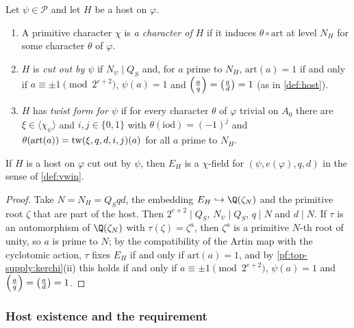 \begin{definition}\label{pf:top-supply:kerchi}
Let $\psi\in\mathcal P$ and let $H$ be a host on $\varphi$.
\begin{enumerate}[label=(\roman*)]
\item A primitive character $\chi$ is \emph{a character of $H$} if it induces $\theta\circ\mathrm{art}$ at level
$N_H$ for some character $\theta$ of $\varphi$.
\item $H$ is \emph{cut out by $\psi$} if $N_\psi\mid Q_S$ and, for $a$ prime to $N_H$, $\mathrm{art}(a)=1$ if and only
if $a\equiv\pm1\pmod{2^{e+2}}$, $\psi(a)=1$ and $\left(\frac{a}{q}\right)=\left(\frac{a}{d}\right)=1$ (as in \cref{def:host}).
\item $H$ has \emph{twist form for $\psi$} if for every character $\theta$ of $\varphi$ trivial on $A_0$ there
are $\xi\in\langle\chi_\psi\rangle$ and $i,j\in\{0,1\}$ with $\theta(\mathrm{iod})=(-1)^j$ and
$\theta(\mathrm{art}(a))=\operatorname{tw}(\xi,q,d,i,j)(a)$ for all $a$ prime to $N_H$.
\end{enumerate}
  
\end{definition}

\begin{lemma}\label{pf:top-supply:ischifield}
If $H$ is a host on $\varphi$ cut out by $\psi$, then $E_H$ is a $\chi$-field for $(\psi,e(\varphi),q,d)$ in the sense
of \cref{def:vwin}. 
\end{lemma}

\begin{proof}
Take $N=N_H=Q_Sqd$, the embedding $E_H\hookrightarrow\Q(\zeta_N)$ and the primitive root $\zeta$ that are part of
the host. Then $2^{e+2}\mid Q_S$, $N_\psi\mid Q_S$, $q\mid N$ and $d\mid N$. If $\tau$ is an automorphism of
$\Q(\zeta_N)$ with $\tau(\zeta)=\zeta^a$, then $\zeta^a$ is a primitive $N$-th root of unity, so $a$ is prime to
$N$; by the compatibility of the Artin map with the cyclotomic action, $\tau$ fixes $E_H$ if and only if
$\mathrm{art}(a)=1$, and by \cref{pf:top-supply:kerchi}(ii) this holds if and only if $a\equiv\pm1\pmod{2^{e+2}}$,
$\psi(a)=1$ and $\left(\frac{a}{q}\right)=\left(\frac{a}{d}\right)=1$.
\end{proof}

\subsubsection{Host existence and the requirement}

